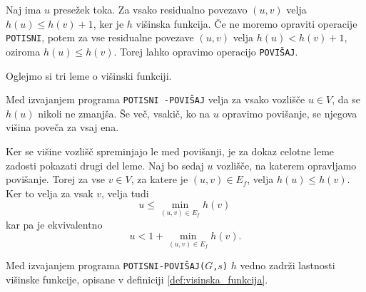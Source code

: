 \documentclass[mat1]{fmfdelo}
\begin{document}
\begin{dokaz}
Naj ima $u$ presežek toka. Za vsako residualno povezavo $(u,v)$ velja $h(u) \leq h(v) + 1$, ker je $h$ višinska funkcija. Če ne moremo opraviti operacije \texttt{POTISNI}, potem za vse residualne povezave $(u,v)$ velja $h(u) < h(v)+1$, oziroma $h(u) \leq h(v)$. Torej lahko opravimo operacijo \texttt{POVIŠAJ}.
\end{dokaz}

Oglejmo si tri leme o višinski funkciji.

\begin{lema}\label{lem:visina_ne_pada}
Med izvajanjem programa \texttt{POTISNI -POVIŠAJ} velja za vsako vozlišče $u \in V$, da se $h(u)$ nikoli ne zmanjša. Še več, vsakič, ko na $u$ opravimo povišanje, se njegova višina poveča za vsaj ena.
\end{lema}

\begin{dokaz}
Ker se višine vozlišč spreminjajo le med povišanji, je za dokaz celotne leme zadosti pokazati drugi del leme. Naj bo sedaj $u$ vozlišče, na katerem opravljamo povišanje. Torej za vse $v \in V$, za katere je $(u,v) \in E_f$, velja $h(u) \leq h(v)$. Ker to velja za vsak $v$, velja tudi \[u \leq \min_{(u,v) \in E_f} h(v)\,\] kar pa je ekvivalentno \[u < 1 + \min_{(u,v) \in E_f} h(v).\]
\end{dokaz}

\begin{lema}\label{lem:h_ostane_visinska}
Med izvajanjem programa \texttt{POTISNI-POVIŠAJ($G$,$s$)} $h$ vedno zadrži lastnosti višinske funkcije, opisane v definiciji \ref{def:visinska_funkcija}.
\end{lema}
\end{document}
